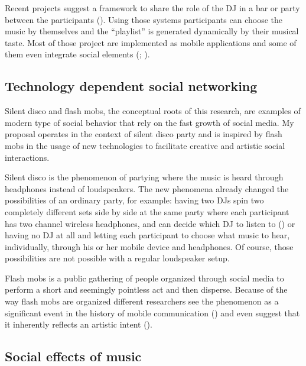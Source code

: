 \documentclass[a4paper,11pt]{article}
\begin{document}
Recent projects suggest a framework to share the role of the DJ in a bar or party between the participants (\cite{web:shaw}).
Using those systems participants can choose the music by themselves and the ``playlist'' is generated dynamically by their musical taste.
Most of those project are implemented as mobile applications and some of them even integrate social elements (\citeauthor{web:playmysong}; \cite{web:lammers}).

\subsection{Technology dependent social networking}

Silent disco and flash mobs, the conceptual roots of this research, are examples of modern type of social behavior that rely on the fast growth of social media.
My proposal operates in the context of silent disco party and is inspired by flash mobs in the usage of new technologies to facilitate creative and artistic social interactions.

Silent disco is the phenomenon of partying where the music is heard through headphones instead of loudspeakers.
The new phenomena already changed the possibilities of an ordinary party, for example: having two DJs spin two completely different sets side by side at the same party where each participant has two channel wireless headphones, and can decide which DJ to listen to (\citeauthor{web:headphonedisco}) or having no DJ at all and letting each participant to choose what music to hear, individually, through his or her mobile device and headphones.
Of course, those possibilities are not possible with a regular loudspeaker setup.

Flash mobs is a public gathering of people organized through social media to perform a short and seemingly pointless act and then disperse.
Because of the way flash mobs are organized different researchers see the phenomenon as a significant event in the history of mobile communication (\cite{nicholson05}) and even suggest that it inherently reflects an artistic intent (\cite{brejzek10}).

\subsection{Social effects of music}

\end{document}
